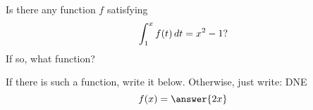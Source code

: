 \documentclass{ximera}
\author{Steven Gubkin}
\begin{document}
\begin{exercise}

Is there any function $f$ satisfying
\[
\int_1^x f(t) \mathop{}\!d t = x^2-1?
\]
If so, what function?

\begin{prompt}
  If there is such a function, write it below.  Otherwise, just write: DNE
  \[
  f(x) = \answer{2x}
  \]
\end{prompt}

\end{exercise}
\end{document}
